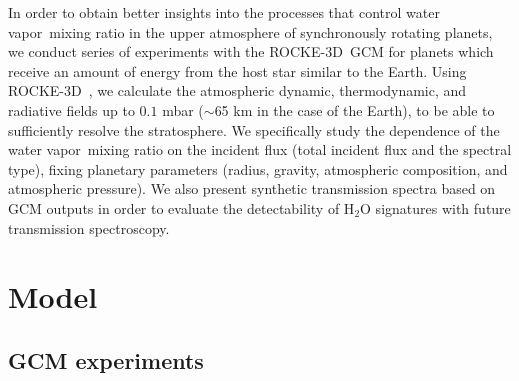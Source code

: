 \documentclass[11pt,numberedappendix,twocolappendix,]{emulateapj}
\def\water{H$_2$O }
\def\modelE{ROCKE-3D}
\def\memo#1{\color{red}$[${\bf #1}$]$ \color{black}}
\newcommand{\wv}{{\color{orange}water vapor\ }}
\begin{document}

In order to obtain better insights into the processes that control \wv mixing ratio in the upper atmosphere of synchronously rotating planets, we conduct series of experiments with the \modelE \ GCM for planets which receive an amount of energy from the host star similar to the Earth. 
Using \modelE \ , we calculate the atmospheric dynamic, thermodynamic, and radiative fields up to $0.1$ mbar ($\sim $65 km in the case of the Earth), to be able to sufficiently resolve the stratosphere. 
We specifically study the dependence of the \wv mixing ratio on the incident flux (total incident flux and the spectral type), fixing planetary parameters (radius, gravity, atmospheric composition, and atmospheric pressure). 
We also present synthetic transmission spectra based on GCM outputs in order to evaluate the detectability of \water signatures with future transmission spectroscopy. 




\section{Model}
\label{s:model}

\subsection{GCM experiments}
\end{document}
